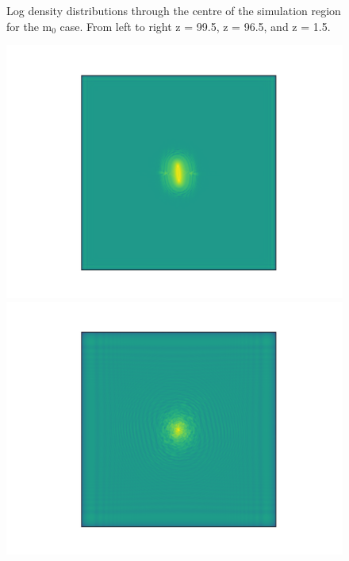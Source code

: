 \documentclass[a4paper,11pt]{article}
\begin{document}
\begin{figure}[!htb]
\endminipage
\caption{Log density distributions through the centre of the simulation region for the $\mathrm{m}_0$ case. From left to right z = 99.5, z = 96.5, and z = 1.5.}\label{fig:contours_light}
\end{figure}


\begin{figure}[!htb]
  \includegraphics[trim={3cm 0 0 0},scale=0.5]{single_mid_plane_1.png}
\endminipage\hfill
{}
  \includegraphics[trim={3cm 0 0 0},scale=0.5]{single_mid_plane_7.png}
\endminipage\hfill
{}%

\end{figure}
\end{document}

